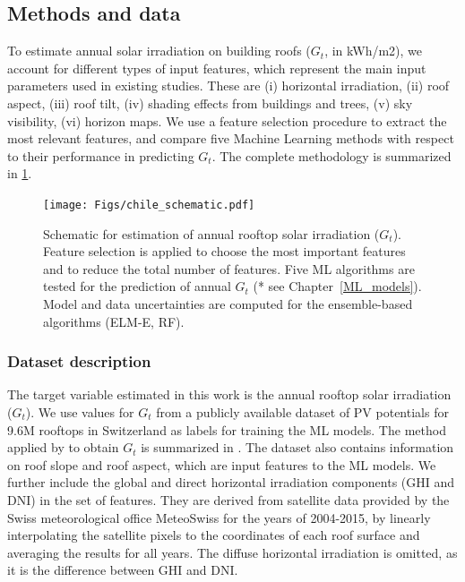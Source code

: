 \subsection{Methods and data}
\label{chile_method}

To estimate annual solar irradiation on building roofs ($G_t$, in kWh/m2), we account for different types of input features, which represent the main input parameters used in existing studies. These are (i) horizontal irradiation, (ii) roof aspect, (iii) roof tilt, (iv) shading effects from buildings and trees, (v) sky visibility, (vi) horizon maps. We use a feature selection procedure to extract the most relevant features, and compare five Machine Learning methods with respect to their performance in predicting $G_t$. The complete methodology is summarized in \ref{fig:chile_schema}.

\begin{figure}[tb]
\centering\texttt{[image: Figs/chile\_schematic.pdf]}
\caption{Schematic for estimation of annual rooftop solar irradiation ($G_t$). Feature selection is applied to choose the most important features and to reduce the total number of features. Five ML algorithms are tested for the prediction of annual $G_t$ (* see Chapter~\ref{ML_models}). Model and data uncertainties are computed for the ensemble-based algorithms (ELM-E, RF). }
\label{fig:chile_schema}
\end{figure}
\subsubsection{Dataset description}

The target variable estimated in this work is the annual rooftop solar irradiation ($G_t$). We use values for $G_t$ from a publicly available dataset of PV potentials for 9.6M rooftops in Switzerland \cite{klauser_solarpotentialanalyse_2016} as labels for training the ML models. The method applied by \citet{klauser_solarpotentialanalyse_2016} to obtain $G_t$ is summarized in \cite{walch_fast_2019-1}. The dataset also contains information on roof slope and roof aspect, which are input features to the ML models. We further include the global and direct horizontal irradiation components (GHI and DNI) in the set of features. They are derived from satellite data provided by the Swiss meteorological office MeteoSwiss \cite{stockli_daily_2013} for the years of 2004-2015, by linearly interpolating the satellite pixels to the coordinates of each roof surface and averaging the results for all years. The diffuse horizontal irradiation is omitted, as it is the difference between GHI and DNI. 

